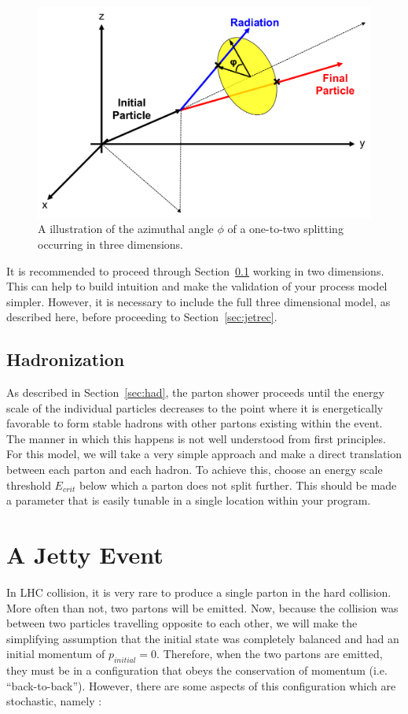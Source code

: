 \documentclass[UKenglish,texlive=2016]{\ATLASLATEXPATH atlasdoc}
\begin{document}
\begin{figure}
\centering
\includegraphics[width=0.7\linewidth]{figures/azimuth.png}
\caption{A illustration of the azimuthal angle $\phi$ of a one-to-two splitting occurring in three dimensions.}
\label{fig:azimuth}
\end{figure}

It is recommended to proceed through Section~\ref{sec:mc_had} working in two dimensions.  This can help to build intuition and make the validation of your process model simpler.  However, it is necessary to include the full three dimensional model, as described here, before proceeding to Section~\ref{sec:jetrec}.


\subsection{Hadronization}
\label{sec:mc_had}
As described in Section~\ref{sec:had}, the parton shower proceeds until the energy scale of the individual particles decreases to the point where it is energetically favorable to form stable hadrons with other partons existing within the event.  The manner in which this happens is not well understood from first principles. For this model, we will take a very simple approach and make a direct translation between each parton and each hadron.  To achieve this, choose an energy scale threshold $E_{crit}$ below which a parton does not split further.  This should be made a parameter that is easily tunable in a single location within your program.

\section{A Jetty Event}
\label{sec:event}
In LHC collision, it is very rare to produce a single parton in the hard collision.  More often than not, two partons will be emitted.  Now, because the collision was between two particles travelling opposite to each other, we will make the simplifying assumption that the initial state was completely balanced and had an initial momentum of $p_{initial}=0$.  Therefore, when the two partons are emitted, they must be in a configuration that obeys the conservation of momentum (i.e. ``back-to-back'').  However, there are some aspects of this configuration which are stochastic, namely :
\end{document}
